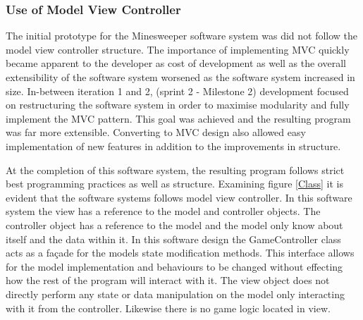 \documentclass[12pt, a4]{report}
\begin{document}
\subsubsection{Use of Model View Controller}
The initial prototype for the Minesweeper software system was did not follow the model view controller structure. The importance of implementing MVC quickly became apparent to the developer as cost of development as well as the overall extensibility of the software system worsened as the software system increased in size. In-between iteration 1 and 2, (sprint 2 - Milestone 2) development focused on restructuring the software system in order to maximise modularity and fully implement the MVC pattern. This goal was achieved and the resulting program was far more extensible. Converting to MVC design also allowed easy implementation of new features in addition to the improvements in structure.
\newline\par
At the completion of this software system, the resulting program follows strict best programming practices as well as structure. Examining figure \ref{Class} it is evident that the software systems follows model view controller. In this software system the view has a reference to the model and controller objects. The controller object has a reference to the model and the model only know about itself and the data within it. In this software design the GameController class acts as a façade for the models state modification methods. This interface allows for the model implementation and behaviours to be changed without effecting how the rest of the program will interact with it. The view object does not directly perform any state or data manipulation on the model only interacting with it from the controller. Likewise there is no game logic located in view.
\end{document}
